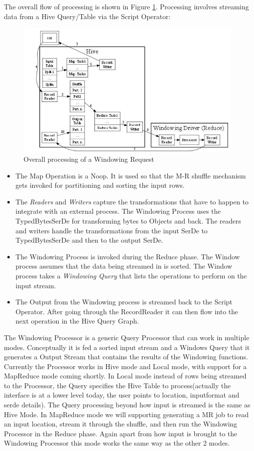 \documentclass[pdftex,10pt,a4paper]{article}
\begin{document}
The overall flow of processing is shown in Figure \ref{arch}. Processing involves streaming data from a Hive Query/Table via the Script Operator:
\begin{figure}[h]
\centering
    \includegraphics[scale=1]{architecture.jpg}
\caption{Overall processing of a Windowing Request}
\label{arch}
  \end{figure}
\begin{itemize}
\item The Map Operation is a Noop. It is used so that the M-R shuffle mechanism gets invoked for partitioning and sorting the input rows.
\item The {\em Readers} and {\em Writers}  capture the transformations that have to happen to integrate with an external process. The Windowing Process uses the TypedBytesSerDe for transforming bytes to Objects and back. The readers and writers handle the transformations from the input SerDe to TypedBytesSerDe and then to the output SerDe.
\item The Windowing Process is invoked during the Reduce phase. The Window process assumes that the data being streamed in is sorted. The Window process takes a {\em Windowing Query} that lists the operations to perform on the input stream.
\item The Output from the Windowing process is streamed back to the Script Operator. After going through the RecordReader it can then flow into the next operation in the Hive Query Graph.
\end{itemize}

The Windowing Processor is a generic Query Processor that can work in multiple modes. Conceptually it is fed a sorted input stream and a Windows Query that it generates a Output Stream that contains the results of the Windowing functions. Currently the Processor works in Hive mode and Local mode, with support for a MapReduce mode coming shortly. 
In Local mode instead of rows being streamed to the Processor, the Query specifies the Hive Table to process(actually the interface is at a lower level today, the user points to location, inputformat and serde details). The Query processing beyond how input is streamed is the same as Hive Mode. In MapReduce mode we will supporting generating a MR job to read an input location, stream it through the shuffle, and then run the Windowing Processor in the Reduce phase. Again apart from how input is brought to the Windowing Processor this mode works the same way as the other 2 modes.
\end{document}
